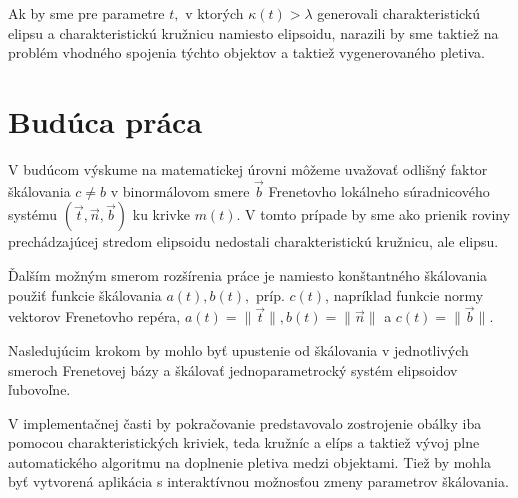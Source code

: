 %

Ak by sme pre parametre $t,$ v ktorých $\kappa(t) > \lambda $ generovali charakteristickú elipsu a charakteristickú kružnicu namiesto elipsoidu, narazili by sme taktiež na problém vhodného spojenia týchto objektov a taktiež vygenerovaného pletiva.

\section{Budúca práca}
V budúcom výskume na matematickej úrovni môžeme uvažovať odlišný faktor škálovania $c \neq b$ v binormálovom smere $\vec{b}$ Frenetovho lokálneho súradnicového systému $(\vec{t}, \vec{n}, \vec{b})$ ku krivke $m(t)$. V tomto prípade by sme ako prienik roviny prechádzajúcej stredom elipsoidu nedostali charakteristickú kružnicu, ale elipsu.

Ďalším možným smerom rozšírenia práce je namiesto konštantného škálovania použiť funkcie škálovania $a(t), b(t),$ príp. $c(t)$, napríklad funkcie normy vektorov Frenetovho repéra, $a(t) = \| \vec{t} \|, b(t) = \| \vec{n} \| $ a $c(t) = \| \vec{b} \|$. 

Nasledujúcim krokom by mohlo byť upustenie od škálovania v jednotlivých smeroch Frenetovej bázy a škálovať jednoparametrocký systém elipsoidov ľubovoľne.

V implementačnej časti by pokračovanie predstavovalo zostrojenie obálky iba pomocou charakteristických kriviek, teda kružníc a elíps a taktiež vývoj plne automatického algoritmu na doplnenie pletiva medzi objektami. Tiež by mohla byť vytvorená aplikácia s interaktívnou možnosťou zmeny parametrov škálovania.